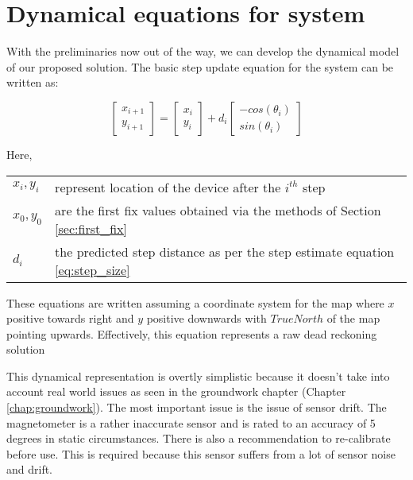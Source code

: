 \section{Dynamical equations for system}

With the preliminaries now out of the way, we can develop the dynamical model
of our proposed solution. The basic step update equation for the system 
can be written as:

\begin{equation}\label{eq:dr_eq}
\begin{bmatrix}x_{i+1}\\
y_{i+1}
\end{bmatrix} = \begin{bmatrix}x_{i}\\
y_{i}
\end{bmatrix}  + d{}_{i} \begin{bmatrix}-cos(\theta_{i})\\
sin(\theta_{i})
\end{bmatrix} 
\end{equation}

Here,\\
\begin{tabular}{p{1in} p{4in}}
$x_i, y_i$          &   represent location of the device after the $i^{th}$ step\\
$x_0, y_0$          &   are the first fix values obtained via the methods of Section \ref{sec:first_fix}\\
$d_i$               &   the predicted step distance as per the step estimate equation \eqref{eq:step_size}\\
\end{tabular}

These equations are written assuming a coordinate system for the map where $x$ positive towards
right and $y$ positive downwards with $TrueNorth$ of the map pointing upwards.
Effectively, this equation represents a raw dead reckoning solution 

This dynamical representation is overtly simplistic because it doesn't take into
account real world issues as seen in the groundwork chapter (Chapter
\ref{chap:groundwork}). The most important issue is the issue of sensor drift.
The magnetometer is a rather inaccurate sensor and is rated to an accuracy of 5
degrees in static circumstances. There is also a recommendation to re-calibrate
before use. This is required because this sensor suffers from a lot of sensor
noise and drift. 

